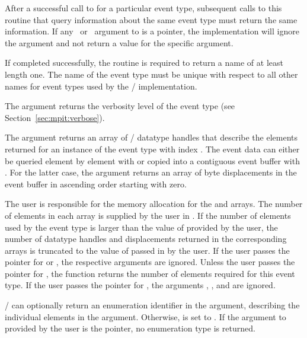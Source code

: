 After a successful call to  for a
particular event type, subsequent calls to this routine that query
information about the same event type must return the same information.  If
any \INOUT\ or \OUT\ argument to
 is a  pointer, the
implementation will ignore the argument and not return a value for the
specific argument.

 If completed successfully,
the routine is required to return a name of at least length one.  The name
of the event type must be unique with respect to all other names for event
types used by the \MPI/ implementation.

The argument  returns the verbosity level of the event
type (see Section~\ref{sec:mpit:verbose}).

The argument  returns an array of \MPI/
datatype handles that describe the elements returned for an instance
of the event type with index .
The event data can either be queried element by element with 
 or copied
into a contiguous event buffer with . 
For the latter case, the 
argument  returns an 
array of byte displacements in the event buffer in ascending order starting with zero.

The user is responsible
for the memory allocation for the  and
 arrays. The number of elements
in each array is supplied by the user in .
If the number of elements used by the event type is larger
than the value of  provided by the user, the number
of datatype handles and displacements returned in the corresponding arrays
is truncated to the value of  passed in by the user.
If the user passes the  pointer for  
or , the respective arguments are ignored.
Unless the user passes the  pointer for , 
the function returns the number of elements required for this event type. 
If the user passes the  pointer for , 
the arguments ,
, and  are
ignored.


\MPI/ can optionally return an enumeration identifier in the
 argument, describing the individual elements in the
 argument. Otherwise,  is set
to . If the argument to 
provided by the user is the  pointer, no enumeration
type is returned.

